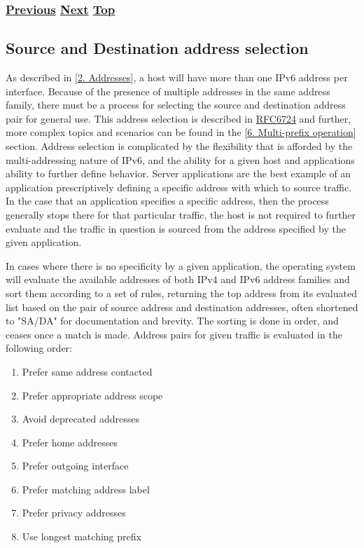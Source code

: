 \documentclass[
]{article}
\providecommand{\tightlist}{%
  \setlength{\itemsep}{0pt}\setlength{\parskip}{0pt}}
\begin{document}
\subsubsection{\texorpdfstring{\hyperref[extension-headers-and-options]{Previous}
\hyperref[source-and-destination-address-selection]{Next}
\hyperref[ipv6-basic-technology]{Top}}{Previous Next Top}}\label{previous-next-top-16}

\pagebreak

\subsection{Source and Destination address
selection}\label{source-and-destination-address-selection}

As described in {[}\hyperref[addresses]{2. Addresses}{]}, a host will
have more than one IPv6 address per interface. Because of the presence
of multiple addresses in the same address family, there must be a
process for selecting the source and destination address pair for
general use. This address selection is described in
\href{https://www.rfc-editor.org/info/rfc6724}{RFC6724} and further,
more complex topics and scenarios can be found in the
{[}\hyperref[multi-prefix-operation]{6. Multi-prefix operation}{]}
section. Address selection is complicated by the flexibility that is
afforded by the multi-addressing nature of IPv6, and the ability for a
given host and applications ability to further define behavior. Server
applications are the best example of an application prescriptively
defining a specific address with which to source traffic. In the case
that an application specifies a specific address, then the process
generally stops there for that particular traffic, the host is not
required to further evaluate and the traffic in question is sourced from
the address specified by the given application.

In cases where there is no specificity by a given application, the
operating system will evaluate the available addresses of both IPv4 and
IPv6 address families and sort them according to a set of rules,
returning the top address from its evaluated list based on the pair of
source address and destination addresses, often shortened to "SA/DA" for
documentation and brevity. The sorting is done in order, and ceases once
a match is made. Address pairs for given traffic is evaluated in the
following order:

\begin{enumerate}
\def\labelenumi{\arabic{enumi}.}
\tightlist
\item
  Prefer same address contacted
\item
  Prefer appropriate address scope
\item
  Avoid deprecated addresses
\item
  Prefer home addresses
\item
  Prefer outgoing interface
\item
  Prefer matching address label
\item
  Prefer privacy addresses
\item
  Use longest matching prefix
\end{enumerate}
\end{document}
